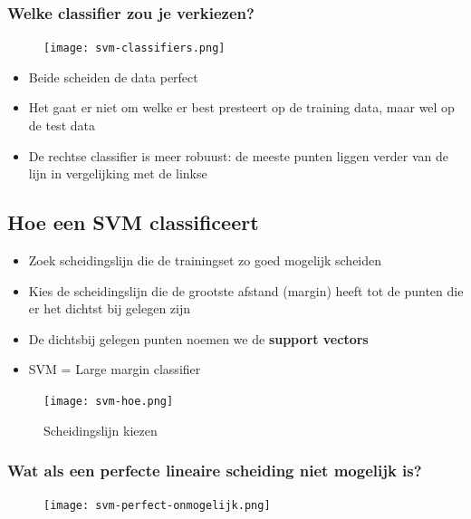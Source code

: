 \documentclass{article}
\begin{document}
\subsubsection{Welke classifier zou je verkiezen?}

\begin{figure}[H]
    \centering
    \texttt{[image: svm-classifiers.png]}
\end{figure}

\begin{itemize}
    \item Beide scheiden de data perfect
    \item Het gaat er niet om welke er best presteert op de training data, maar wel op de test data
    \item De rechtse classifier is meer robuust: de meeste punten liggen verder van de lijn in vergelijking met de linkse
\end{itemize}

\subsection{Hoe een SVM classificeert}

\begin{itemize}
    \item Zoek scheidingslijn die de trainingset zo goed mogelijk scheiden
    \item Kies de scheidingslijn die de grootste afstand (margin) heeft tot de punten die er het dichtst bij gelegen zijn
    \item De dichtsbij gelegen punten noemen we de \textbf{support vectors}
    \item SVM = Large margin classifier
\end{itemize}

\begin{figure}[H]
    \centering
    \texttt{[image: svm-hoe.png]}
    \caption{Scheidingslijn kiezen}
\end{figure}

\subsubsection{Wat als een perfecte lineaire scheiding niet mogelijk is?}

\begin{figure}[H]
    \centering
    \texttt{[image: svm-perfect-onmogelijk.png]}
    \caption{}
\end{figure}
\end{document}
